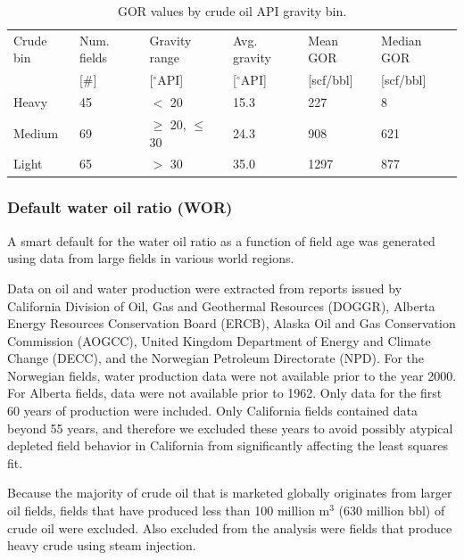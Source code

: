 \documentclass[11pt]{report}
\newcommand{\marg}[1]{{\footnotesize\textit{\textcolor{stanford}{'#1'}}}}
\newcommand{\marginnote}[1]{\marginpar{\marg{#1}}}
\begin{document}
\begin{table}
\begin{scriptsize}
\caption{GOR values by crude oil API gravity bin.}
\label{tab:GOR_averages}
\begin{tabular*}{0.85\columnwidth}{p{}p{}p{}p{}p{}p{}}
\toprule
Crude bin & Num. fields & Gravity range & Avg. gravity & Mean GOR & Median GOR \\
& [\#] & [$^\circ$API] & [$^\circ$API] & [scf/bbl] & [scf/bbl] \\
\midrule
Heavy & 45 & $<$ 20 & 15.3 & 227 & 8 \\
Medium & 69 & $\geq$ 20, $\leq$ 30 & 24.3 & 908 & 621 \\
Light & 65 & $>$ 30 & 35.0 & 1297 & 877 \\
\bottomrule
\end{tabular*}
\end{scriptsize}
\end{table}


\subsubsection{Default water oil ratio (WOR)} \label{WORSmartDefault}

A smart default for the water oil ratio as a function of field age was generated using data from large fields in various world regions. \marginnote{Active Field 2.4.2}

Data on oil and water production were extracted from reports issued by California Division of Oil, Gas and Geothermal Resources (DOGGR), Alberta Energy Resources Conservation Board (ERCB), Alaska Oil and Gas Conservation Commission (AOGCC), United Kingdom Department of Energy and Climate Change (DECC), and the Norwegian Petroleum Directorate (NPD). For the Norwegian fields, water production data were not available prior to the year 2000. For Alberta fields, data were not available prior to 1962. Only data for the first 60 years of production were included. Only California fields contained data beyond 55 years, and therefore we excluded these years to avoid possibly atypical depleted field behavior in California from significantly affecting the least squares fit. 

Because the majority of crude oil that is marketed globally originates from larger oil fields, fields that have produced less than 100 million m$^3$ (630 million bbl) of crude oil were excluded. Also excluded from the analysis were fields that produce heavy crude using steam injection. 
\end{document}
